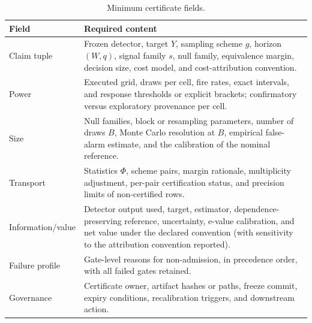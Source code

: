 \documentclass[3p]{elsarticle}
\begin{document}
\begin{table}[htbp]
\centering
\caption{Minimum certificate fields.}
\label{tab:certificate}
\small
\begin{tabularx}{\textwidth}{@{}lX@{}}
\toprule
Field & Required content \\
\midrule
Claim tuple & Frozen detector, target $Y$, sampling scheme $g$, horizon $(W,q)$, signal family $s$, null family, equivalence margin, decision size, cost model, and cost-attribution convention. \\
Power & Executed grid, draws per cell, fire rates, exact intervals, and response thresholds or explicit brackets; confirmatory versus exploratory provenance per cell. \\
Size & Null families, block or resampling parameters, number of draws $B$, Monte Carlo resolution at $B$, empirical false-alarm estimate, and the calibration of the nominal reference. \\
Transport & Statistics $\Phi$, scheme pairs, margin rationale, multiplicity adjustment, per-pair certification status, and precision limits of non-certified rows. \\
Information/value & Detector output used, target, estimator, dependence-preserving reference, uncertainty, e-value calibration, and net value under the declared convention (with sensitivity to the attribution convention reported). \\
Failure profile & Gate-level reasons for non-admission, in precedence order, with all failed gates retained. \\
Governance & Certificate owner, artifact hashes or paths, freeze commit, expiry conditions, recalibration triggers, and downstream action. \\
\bottomrule
\end{tabularx}
\end{table}
\end{document}
